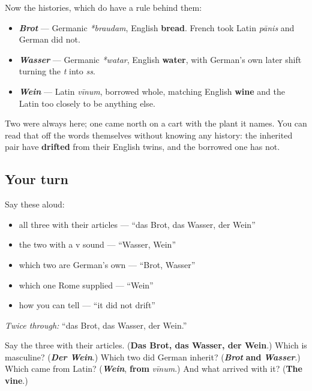 \begin{culture}
Now the histories, which do have a rule behind them:

\begin{itemize}
\raggedright
  \item \emph{\textbf{Brot}} — Germanic \emph{*braudam}, English \textbf{bread}. French took Latin \emph{pānis} and German did not.
  \item \emph{\textbf{Wasser}} — Germanic \emph{*watar}, English \textbf{water}, with German's own later shift turning the \emph{t} into \emph{ss}.
  \item \emph{\textbf{Wein}} — Latin \emph{vīnum}, borrowed whole, matching English \textbf{wine} and the Latin too closely to be anything else.
\end{itemize}

Two were always here; one came north on a cart with the plant it names. You can read that off the words themselves without knowing any history: the inherited pair have \textbf{drifted} from their English twins, and the borrowed one has not.
\end{culture}

\subsection*{Your turn}
Say these aloud:

\begin{itemize}
\raggedright
  \item all three with their articles — \textquotedblleft{}das Brot, das Wasser, der Wein\textquotedblright{}
  \item the two with a v sound — \textquotedblleft{}Wasser, Wein\textquotedblright{}
  \item which two are German's own — \textquotedblleft{}Brot, Wasser\textquotedblright{}
  \item which one Rome supplied — \textquotedblleft{}Wein\textquotedblright{}
  \item how you can tell — \textquotedblleft{}it did not drift\textquotedblright{}
\end{itemize}

\emph{Twice through:} \textquotedblleft{}das Brot, das Wasser, der Wein.\textquotedblright{}

\begin{tcolorbox}[breakable,colback=teal!4,colframe=teal!35!black,title={Before you move on}]
Say the three with their articles. (\textbf{Das Brot, das Wasser, der Wein}.) Which is masculine? (\emph{\textbf{Der Wein}}.) Which two did German inherit? (\emph{\textbf{Brot}} \textbf{and} \emph{\textbf{Wasser}}.) Which came from Latin? (\emph{\textbf{Wein}}, \textbf{from} \emph{vīnum}.) And what arrived with it? (\textbf{The vine}.)
\end{tcolorbox}

